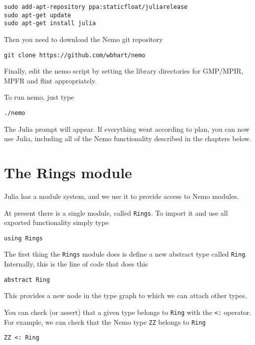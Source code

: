 \documentclass[a4paper,10pt]{article}
\newcommand{\code}{\lstinline}
\begin{document}
{\begin{verbatim}
sudo add-apt-repository ppa:staticfloat/juliarelease
sudo apt-get update
sudo apt-get install julia
\end{verbatim}

Then you need to download the Nemo git repository

\begin{verbatim}
git clone https://github.com/wbhart/nemo
\end{verbatim}

Finally, edit the nemo script by setting the library directories for GMP/MPIR, MPFR
and flint appropriately.

To run nemo, just type

\begin{verbatim}
./nemo
\end{verbatim}

The Julia prompt will appear. If everything went according to plan, you can now use 
Julia, including all of the Nemo functionality described in the chapters below.

\section{The Rings module}

Julia has a module system, and we use it to provide access to Nemo modules.

At present there is a single module, called \code{Rings}. To import it and use all
exported functionality simply type

\begin{lstlisting}
using Rings
\end{lstlisting}

The first thing the \code{Rings} module does is define a new abstract type called
\code{Ring}. Internally, this is the line of code that does this

\begin{lstlisting}
abstract Ring
\end{lstlisting}

This provides a new node in the type graph to which we can attach other types. 

You can check (or assert) that a given type belongs to \code{Ring} with the
\code{<:} operator. For example, we can check that the Nemo type \code{ZZ} belongs
to \code{Ring}

\begin{lstlisting}
ZZ <: Ring
\end{lstlisting}

}
\end{document}
